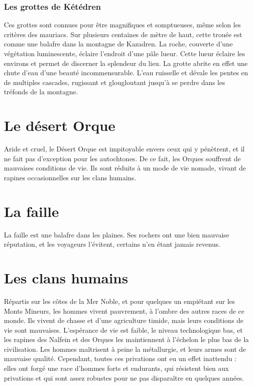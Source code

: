 \subsubsection{Les grottes de Kétédren}
Ces grottes sont connues pour être magnifiques et somptueuses, même selon les critères des mauriacs. Sur plusieurs centaines de mètre de haut, cette trouée est comme une balafre dans la montagne de Kazadren. La roche, couverte d'une végétation luminescente, éclaire l'endroit d'une pâle lueur. Cette lueur éclaire les environs et permet de discerner la splendeur du lieu. La grotte abrite en effet une chute d'eau d'une beauté incommensurable. L'eau ruisselle et dévale les pentes en de multiples cascades, rugissant et glougloutant jusqu'à se perdre dans les tréfonds de la montagne.
\section{Le désert Orque}
Aride et cruel, le Désert Orque est impitoyable envers ceux qui y pénètrent, et il ne fait pas d'exception pour les autochtones. De ce fait, les Orques souffrent de mauvaises conditions de vie. Ils sont réduits à un mode de vie nomade, vivant de rapines occasionnelles sur les clans humains.
\section{La faille}
La faille est une balafre dans les plaines. Ses rochers ont une bien mauvaise réputation, et les voyageurs l’évitent, certains n'en étant jamais revenus.
\section{Les clans humains}
Répartis sur les côtes de la Mer Noble, et pour quelques un empiétant sur les Monts Mineurs, les hommes vivent pauvrement, à l'ombre des autres races de ce monde. Ils vivent de chasse et d'une agriculture timide, mais leurs conditions de vie sont mauvaises. L'espérance de vie est faible, le niveau technologique bas, et les rapines des Nalfein et des Orques les maintiennent à l'échelon le plus bas de la civilisation. Les hommes maîtrisent à peine la métallurgie, et leurs armes sont de mauvaise qualité. Cependant, toutes ces privations ont eu un effet inattendu : elles ont forgé une race d'hommes forts et endurants, qui résistent bien aux privations et qui sont assez robustes pour ne pas disparaître en quelques années.
